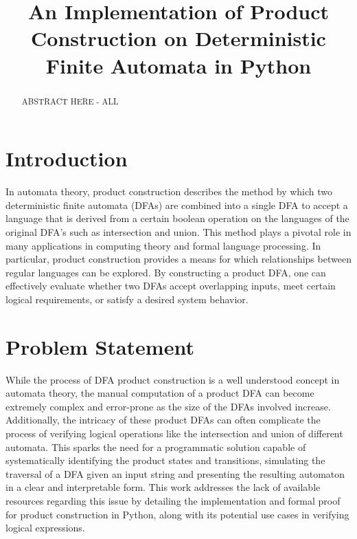 \documentclass[conference]{IEEEtran}
\begin{document}
\title{An Implementation of Product Construction on Deterministic Finite Automata in Python}

\author{
\and
{}
\and
{}
}

\maketitle

\begin{abstract}
ABSTRACT HERE - ALL
\end{abstract}

\section{Introduction}
In automata theory, product construction describes the method by which two deterministic finite automata (DFAs) are combined into a single DFA to accept a language that is derived from a certain boolean operation on the languages of the original DFA's such as intersection and union. This method plays a pivotal role in many applications in computing theory and formal language processing. In particular, product construction provides a means for which relationships between regular languages can be explored. By constructing a product DFA, one can effectively evaluate whether two DFAs accept overlapping inputs, meet certain logical requirements, or satisfy a desired system behavior.

\section{Problem Statement}
While the process of DFA product construction is a well understood concept in automata theory, the manual computation of a product DFA can become extremely complex and error-prone as the size of the DFAs involved increase. Additionally, the intricacy of these product DFAs can often complicate the process of verifying logical operations like the intersection and union of different automata. This sparks the need for a programmatic solution capable of systematically identifying the product states and transitions, simulating the traversal of a DFA given an input string and presenting the resulting automaton in a clear and interpretable form. This work addresses the lack of available resources regarding this issue by detailing the implementation and formal proof for product construction in Python, along with its potential use cases in verifying logical expressions.
\end{document}

